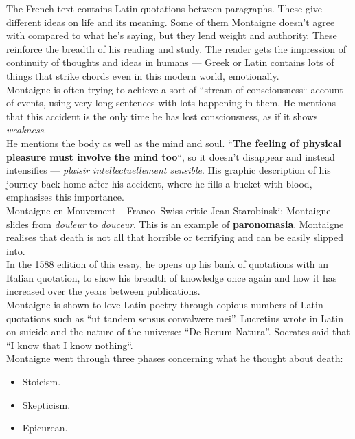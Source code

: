 \documentclass{article}
\begin{document}
The French text contains Latin quotations between paragraphs. These
give different ideas on life and its meaning. Some of them Montaigne
doesn't agree with compared to what he's saying, but they lend weight
and authority. These reinforce the breadth of his reading and study.
The reader gets the impression of continuity of thoughts and ideas in
humans --- Greek or Latin contains lots of things that strike chords
even in this modern world, emotionally.\\

Montaigne is often trying to achieve a sort of ``stream of
consciousness`` account of events, using very long sentences with lots
happening in them. He mentions that this accident is the only time he
has lost consciousness, as if it shows \textit{weakness}.\\

He mentions the body as well as the mind and soul. ``\textbf{The
feeling of physical pleasure must involve the mind too}``, so it
doesn't disappear and instead intensifies --- \textit{plaisir
intellectuellement sensible}. His graphic description of his journey
back home after his accident, where he fills a bucket with blood,
emphasises this importance.\\

Montaigne en Mouvement -- Franco--Swiss critic Jean Starobinski:
Montaigne slides from \textit{douleur} to \textit{douceur}.  This is
an example of \textbf{paronomasia}. Montaigne realises that death is
not all that horrible or terrifying and can be easily slipped into.\\

In the 1588 edition of this essay, he opens up his bank of quotations
with an Italian quotation, to show his breadth of knowledge once again
and how it has increased over the years between publications.\\

Montaigne is shown to love Latin poetry through copious numbers of
Latin quotations such as ``ut tandem sensus convalwere mei''.
Lucretius wrote in Latin on suicide and the nature of the universe:
``De Rerum Natura''. Socrates said that ``I know that I know
nothing``.\\

Montaigne went through three phases concerning what he thought about
death:
\begin{itemize}
  \item{Stoicism.}
  \item{Skepticism.}
  \item{Epicurean.}
\end{itemize}
\end{document}
